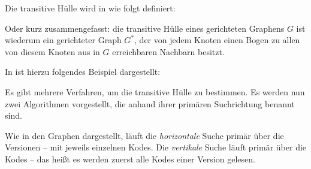 Die transitive Hülle wird in \cite[Seite 172]{gross2013handbook} wie folgt definiert: 

\begin{figure}[H]
    \centering
    \setlength{\fboxsep}{10pt}\color{black!20}
    \normalcolor%
\end{figure}

Oder kurz zusammengefasst: die transitive Hülle eines gerichteten Graphens $G$ ist wiederum ein gerichteter Graph $G^*$, der von jedem Knoten einen Bogen zu allen von diesem Knoten aus in $G$ erreichbaren Nachbarn besitzt. 

\newpage

In \cite[Seite 172]{gross2013handbook} ist hierzu folgendes Beispiel dargestellt:

\begin{figure}[H]
    \centering
    \setlength{\fboxsep}{10pt}\color{black!20}
    \normalcolor%
\end{figure}

Es gibt mehrere Verfahren, um die transitive Hülle zu bestimmen. Es werden nun zwei Algorithmen vorgestellt, die anhand ihrer primären Suchrichtung benannt sind.

Wie in den Graphen dargestellt, läuft die \emph{horizontale} Suche primär über die Versionen -- mit jeweils einzelnen Kodes. Die \emph{vertikale} Suche läuft primär über die Kodes -- das heißt es werden zuerst alle Kodes einer Version gelesen.

